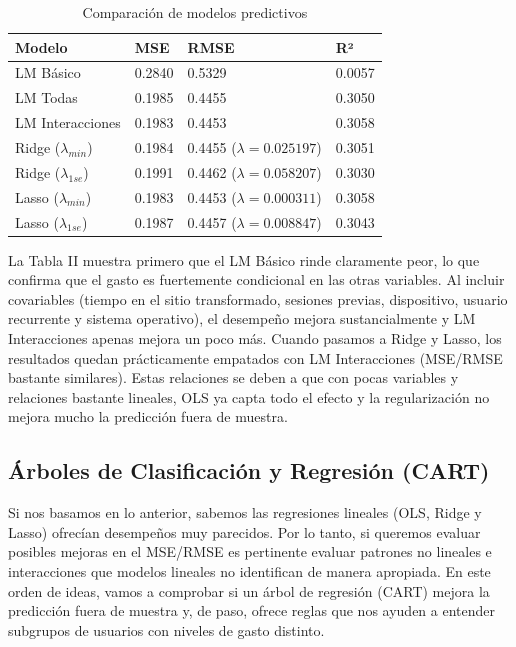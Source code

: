 \documentclass[conference]{IEEEtran}
\begin{document}
\begin{table}[H]
\caption{Comparación de modelos predictivos}
\centering
\begin{tabular}[t]{l|l|l|l}
\hline
Modelo & MSE & RMSE & R²\\
\hline
LM Básico & 0.2840 & 0.5329 & 0.0057\\
\hline
LM Todas & 0.1985 & 0.4455 & 0.3050\\
\hline
LM Interacciones & 0.1983 & 0.4453 & 0.3058\\
\hline
Ridge ($\lambda_{min}$) & 0.1984 & 0.4455
($\lambda = 0.025197$) & 0.3051\\
\hline
Ridge ($\lambda_{1se}$) & 0.1991 & 0.4462
($\lambda = 0.058207$) & 0.3030\\
\hline
Lasso ($\lambda_{min}$) & 0.1983 & 0.4453
($\lambda = 0.000311$) & 0.3058\\
\hline
Lasso ($\lambda_{1se}$) & 0.1987 & 0.4457
($\lambda = 0.008847$) & 0.3043\\
\end{tabular}
\end{table}

La Tabla II muestra primero que el LM Básico rinde claramente peor, lo que confirma que el gasto es fuertemente condicional en las otras variables. Al incluir covariables (tiempo en el sitio transformado, sesiones previas, dispositivo, usuario recurrente y sistema operativo), el desempeño mejora sustancialmente y LM Interacciones apenas mejora un poco más. Cuando pasamos a Ridge y Lasso, los resultados quedan prácticamente empatados con LM Interacciones (MSE/RMSE bastante similares). Estas relaciones se deben a que con pocas variables y relaciones bastante lineales, OLS ya capta todo el efecto y la regularización no mejora mucho la predicción fuera de muestra.

\subsection{Árboles de Clasificación y Regresión (CART)}

Si nos basamos en lo anterior, sabemos las regresiones lineales (OLS, Ridge y Lasso) ofrecían desempeños muy parecidos. Por lo tanto, si queremos evaluar posibles mejoras en el MSE/RMSE es pertinente evaluar patrones no lineales e interacciones que modelos lineales no identifican de manera apropiada. En este orden de ideas, vamos a comprobar si un árbol de regresión (CART) mejora la predicción fuera de muestra y, de paso, ofrece reglas que nos ayuden a entender subgrupos de usuarios con niveles de gasto distinto.
\end{document}
